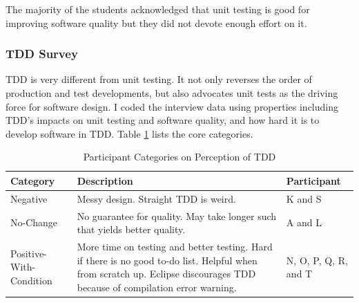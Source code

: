 The majority of the students acknowledged that unit testing is good for 
improving software quality but they did not devote enough effort on it. 

\subsubsection{TDD Survey}
TDD is very different from unit testing. It not only reverses the
order of production and test developments, but also advocates 
unit tests as the driving force for software design. I coded
the interview data using properties including TDD's impacts on 
unit testing and software quality, and how hard it is to develop 
software in TDD. Table \ref{tab:TDDPerceptionCategory} lists
the core categories.
\begin{table}[!htbp]
\centering
  \begin{tabular}{|l|p{5cm}|l|}
  \hline
    Category &  Description & Participant \\ \hline
    Negative & Messy design. Straight TDD is weird. & K and S\\ \hline
    No-Change & No guarantee for quality. May take longer such that yields better quality. 
                            & A and L \\ \hline 
    Positive-With-Condition & More time on testing and better testing. Hard
                              if there is no good to-do list. Helpful when from scratch up.
                              Eclipse discourages TDD because of compilation error warning. 
                              & N, O, P, Q, R, and T \\ \hline
    \end{tabular}
  \caption{Participant Categories on Perception of TDD}\label{tab:TDDPerceptionCategory}  
\end{table}

